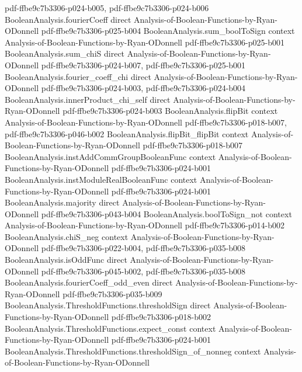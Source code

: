 \begin{theorem}
  {pdf-ffbe9c7b3306-p024-b005,
    pdf-ffbe9c7b3306-p024-b006}
\proofstep
  {BooleanAnalysis.fourierCoeff}
  {direct}
  {Analysis-of-Boolean-Functions-by-Ryan-ODonnell}
  {pdf-ffbe9c7b3306-p025-b004}
\proofstep
  {BooleanAnalysis.sum_boolToSign}
  {context}
  {Analysis-of-Boolean-Functions-by-Ryan-ODonnell}
  {pdf-ffbe9c7b3306-p025-b001}
\proofstep
  {BooleanAnalysis.sum_chiS}
  {direct}
  {Analysis-of-Boolean-Functions-by-Ryan-ODonnell}
  {pdf-ffbe9c7b3306-p024-b007,
    pdf-ffbe9c7b3306-p025-b001}
\proofstep
  {BooleanAnalysis.fourier_coeff_chi}
  {direct}
  {Analysis-of-Boolean-Functions-by-Ryan-ODonnell}
  {pdf-ffbe9c7b3306-p024-b003,
    pdf-ffbe9c7b3306-p024-b004}
\proofstep
  {BooleanAnalysis.innerProduct_chi_self}
  {direct}
  {Analysis-of-Boolean-Functions-by-Ryan-ODonnell}
  {pdf-ffbe9c7b3306-p024-b003}
\proofstep
  {BooleanAnalysis.flipBit}
  {context}
  {Analysis-of-Boolean-Functions-by-Ryan-ODonnell}
  {pdf-ffbe9c7b3306-p018-b007,
    pdf-ffbe9c7b3306-p046-b002}
\proofstep
  {BooleanAnalysis.flipBit_flipBit}
  {context}
  {Analysis-of-Boolean-Functions-by-Ryan-ODonnell}
  {pdf-ffbe9c7b3306-p018-b007}
\proofstep
  {BooleanAnalysis.instAddCommGroupBooleanFunc}
  {context}
  {Analysis-of-Boolean-Functions-by-Ryan-ODonnell}
  {pdf-ffbe9c7b3306-p024-b001}
\proofstep
  {BooleanAnalysis.instModuleRealBooleanFunc}
  {context}
  {Analysis-of-Boolean-Functions-by-Ryan-ODonnell}
  {pdf-ffbe9c7b3306-p024-b001}
\proofstep
  {BooleanAnalysis.majority}
  {direct}
  {Analysis-of-Boolean-Functions-by-Ryan-ODonnell}
  {pdf-ffbe9c7b3306-p043-b004}
\proofstep
  {BooleanAnalysis.boolToSign_not}
  {context}
  {Analysis-of-Boolean-Functions-by-Ryan-ODonnell}
  {pdf-ffbe9c7b3306-p014-b002}
\proofstep
  {BooleanAnalysis.chiS_neg}
  {context}
  {Analysis-of-Boolean-Functions-by-Ryan-ODonnell}
  {pdf-ffbe9c7b3306-p022-b004,
    pdf-ffbe9c7b3306-p035-b008}
\proofstep
  {BooleanAnalysis.isOddFunc}
  {direct}
  {Analysis-of-Boolean-Functions-by-Ryan-ODonnell}
  {pdf-ffbe9c7b3306-p045-b002,
    pdf-ffbe9c7b3306-p035-b008}
\proofstep
  {BooleanAnalysis.fourierCoeff_odd_even}
  {direct}
  {Analysis-of-Boolean-Functions-by-Ryan-ODonnell}
  {pdf-ffbe9c7b3306-p035-b009}
\proofstep
  {BooleanAnalysis.ThresholdFunctions.thresholdSign}
  {direct}
  {Analysis-of-Boolean-Functions-by-Ryan-ODonnell}
  {pdf-ffbe9c7b3306-p018-b002}
\proofstep
  {BooleanAnalysis.ThresholdFunctions.expect_const}
  {context}
  {Analysis-of-Boolean-Functions-by-Ryan-ODonnell}
  {pdf-ffbe9c7b3306-p024-b001}
\proofstep
  {BooleanAnalysis.ThresholdFunctions.thresholdSign_of_nonneg}
  {context}
  {Analysis-of-Boolean-Functions-by-Ryan-ODonnell}

\end{theorem}
